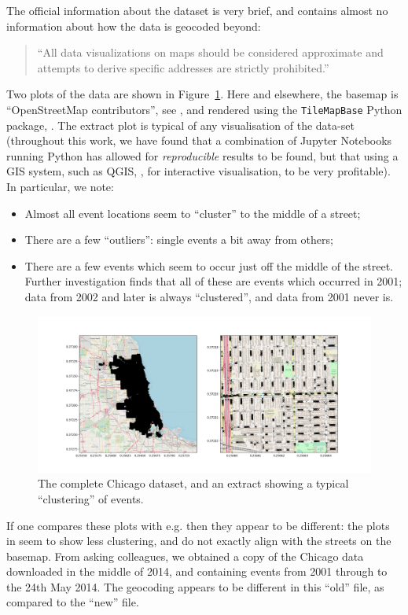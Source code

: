 \documentclass[twoside,a4paper,twocolumn,10pt]{article}
\theoremstyle{plain}
\theoremstyle{definition}
\begin{document}
The official information about the dataset is very brief, and contains almost no information about
how the data is geocoded beyond:
\begin{quote}
``All data visualizations on maps should be considered approximate and
attempts to derive specific addresses are strictly prohibited.''
\end{quote}
Two plots of the data are shown in Figure~\ref{fig:one}.  Here and elsewhere, the basemap is
``\textcopyright OpenStreetMap contributors'', see \cite{osm}, and rendered using the
\texttt{TileMapBase} Python package, \cite{tmb}.  The extract plot is typical of any visualisation
of the data-set (throughout this work, we have found that a combination of Jupyter Notebooks running
Python has allowed for \emph{reproducible} results to be found, but that using a GIS system,
such as QGIS, \cite{qgis}, for interactive visualisation, to be very profitable).  In particular,
we note:
\begin{itemize}
\item Almost all event locations seem to ``cluster'' to the middle of a street;
\item There are a few ``outliers'': single events a bit away from others;
\item There are a few events which seem to occur just off the middle of the street.  Further
  investigation finds that all of these are events which occurred in 2001; data from 2002 and
  later is always ``clustered'', and data from 2001 never is.
\end{itemize}

\begin{figure}
  \includegraphics[width=\textwidth]{Chicago_overview.png}
  \caption{The complete Chicago dataset, and an extract showing a typical ``clustering'' of events.}
  \label{fig:one}
\end{figure}

If one compares these plots with e.g. \cite[Page~3]{rosser_sepp} then they appear to be
different: the plots in \cite{rosser_sepp} seem to show less clustering, and do not exactly
align with the streets on the basemap.  From asking colleagues, we obtained a copy of the
Chicago data downloaded in the middle of 2014, and containing events from 2001 through to
the 24th May 2014.  The geocoding appears to be different in this ``old'' file,
as compared to the ``new'' file.
\end{document}
